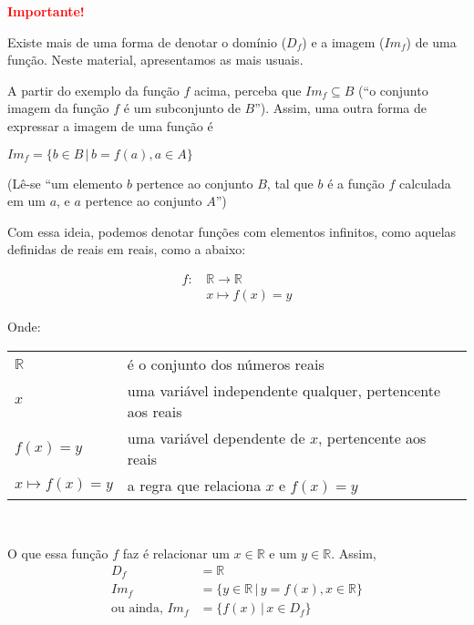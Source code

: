 \documentclass[12pt,openright,twoside,a4paper]{article}
\makeatletter
\theoremstyle{definition}
\newenvironment{condicoes}[1][Onde:]
{#1 \begin{tabular}[t]{>{$}l<{$} @{${} \implies {}$} l}}
	{\end{tabular}\\[\belowdisplayskip]}
\makeatother
\begin{document}
	\begin{snugshade}
		\textbf{\textcolor{red}{Importante!}}
		
		Existe mais de uma forma de denotar o domínio ($D_f$) e a imagem ($Im_f$) de uma função. Neste material, apresentamos as mais usuais.
		
		A partir do exemplo da função $f$ acima, perceba que $Im_f \subseteq B$ (``o conjunto imagem da função $f$ é um subconjunto de $B$''). Assim, uma outra forma de expressar a imagem de uma função é
		
		\begin{center}
			$Im_f = \{b \in B \,|\, b = f(a), a \in A\}$
			
			(Lê-se ``um elemento $b$ pertence ao conjunto $B$, tal que $b$ é a função $f$ calculada em um $a$, e $a$ pertence ao conjunto $A$'')
		\end{center}
		
		Com essa ideia, podemos denotar funções com elementos infinitos, como aquelas definidas de reais em reais, como a abaixo:
		
		\begin{align*}
			f:\, &\mathbb{R} \longrightarrow \mathbb{R}\\
			&x \mapsto f(x) = y
		\end{align*}
		
		
		\begin{condicoes}
			\mathbb{R} & é o conjunto dos números reais\\
			x & uma variável independente qualquer, pertencente aos reais\\
			f(x) = y & uma variável dependente de $x$, pertencente aos reais\\
			x \mapsto f(x) = y & a regra que relaciona $x$ e $f(x) = y$
		\end{condicoes}
		
		O que essa função $f$ faz é relacionar um $x \in \mathbb{R}$ e um $y \in \mathbb{R}$. Assim,
		\begin{align*}
			D_f &= \mathbb{R}\\
			Im_f &= \{y \in \mathbb{R} \,|\, y = f(x), x \in \mathbb{R}\}\\
			\text{ou ainda, } Im_f &= \{f(x) \,|\, x \in D_f\}
		\end{align*}
		
	\end{snugshade}
	
\end{document}
